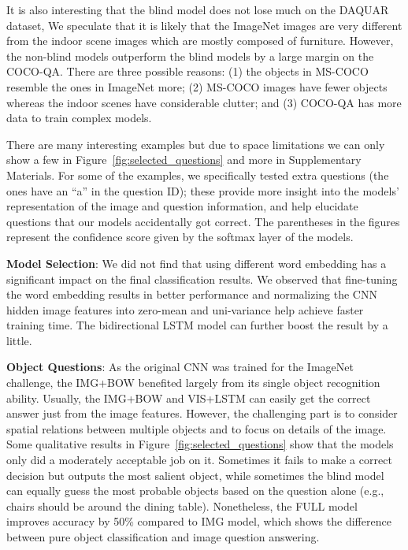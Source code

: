 \documentclass{article} %
\renewcommand{\#}[1]{\textbf{#1}}
\begin{document}
It is also interesting that the blind model does not 
lose much on the DAQUAR dataset,
We speculate that it is likely that the
ImageNet images are very different from the indoor scene images which are
mostly composed of furniture. 
However, the non-blind models
outperform the blind models by a large margin on the COCO-QA. There
are three possible reasons: (1) the objects in MS-COCO resemble the
ones in ImageNet more; (2) MS-COCO images have fewer objects whereas the
indoor scenes have considerable clutter; and (3) COCO-QA has more data to 
train complex models.

There are many interesting examples but 
due to space limitations we can only
show a few in Figure~\ref{fig:selected_questions} and more in Supplementary Materials.
For some of the examples, we
specifically tested extra questions 
(the ones have an ``a'' in the question
ID); these provide more insight into the models' representation
of the image and question information, and
help elucidate questions that our models accidentally 
got correct. The parentheses in the figures 
represent the confidence score given 
by the softmax layer of the models. 

\textbf{Model Selection}:
We did not find that using different word embedding 
has a significant impact on the final classification results. 
We observed that fine-tuning the word embedding results in better performance 
and 
normalizing the CNN hidden image features into zero-mean and uni-variance 
help achieve faster training time. The bidirectional LSTM model can further 
boost the result by a little. 

\textbf{Object Questions}:
As the original CNN was trained for the ImageNet challenge, the IMG+BOW
benefited largely from its single object recognition ability. Usually, 
the IMG+BOW and VIS+LSTM can easily get the correct
answer just from the image features. However, the challenging part is to
consider spatial relations between multiple objects and to focus on details of
the image. Some qualitative results in 
Figure~\ref{fig:selected_questions} show
that the models only did a moderately acceptable job on it. Sometimes it
fails to make a correct decision but outputs the most salient object, while
sometimes the blind model can equally guess the most probable objects based 
on the question alone (e.g., chairs should be around the dining table). 
Nonetheless, the FULL model improves accuracy by 50\% compared to IMG model, 
which shows the difference between pure object classification 
and image question answering.
\end{document}
